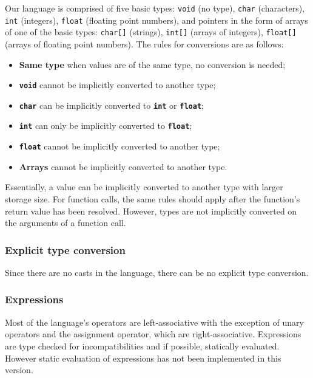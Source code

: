 Our language is comprised of five basic types:
\texttt{void} (no type), 
\texttt{char} (characters),
\texttt{int} (integers),
\texttt{float} (floating point numbers),
and pointers in the form of arrays of one of the basic types:
\texttt{char[]} (strings),
\texttt{int[]} (arrays of integers),
\texttt{float[]} (arrays of floating point numbers).
 The rules for conversions are as follows:

\begin{itemize}
 \item \textbf{Same type} when values are of the same type, no conversion is needed;
 \item \textbf{\texttt{void}} cannot be implicitly converted to another type;
 \item \textbf{\texttt{char}} can be implicitly converted to \textbf{\texttt{int}} or \textbf{\texttt{float}};
 \item \textbf{\texttt{int}} can only be implicitly converted to \textbf{\texttt{float}};
 \item \textbf{\texttt{float}} cannot be implicitly converted to another type;
 \item \textbf{Arrays} cannot be implicitly converted to another type.
\end{itemize}

Essentially, a value can be implicitly converted to another type with larger storage size.
For function calls, the same rules should apply after the function's return value has been
resolved. However, types are not implicitly converted on the arguments of a function call.

\subsubsection{Explicit type conversion}

Since there are no casts in the language, there can be no explicit type conversion.

\subsubsection{Expressions}

Most of the language's operators are left-associative with the exception of unary operators
and the assignment operator, which are right-associative. Expressions are type checked
for incompatibilities and if possible, statically evaluated. However static evaluation of
expressions has not been implemented in this version.

